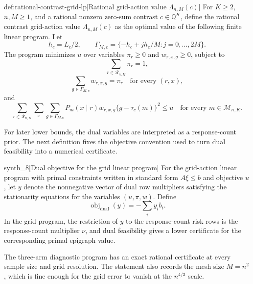\documentclass[11pt]{article}
\begin{document}
\begin{definitionv}{def:rational-contrast-grid-lp}[Rational grid-action value \(\Lambda_{n,M}(c)\)]
For \(K\geq 2\), \(n,M\geq 1\), and a rational nonzero zero-sum contrast \(c\in\mathbb Q^K\), define the rational contrast grid-action value \(\Lambda_{n,M}(c)\) as the optimal value of the following finite linear program. Let
\[
h_c=L_c/2,
\qquad
\Gamma_{M,c}=\{-h_c+jh_c/M:j=0,\ldots,2M\}.
\]
The program minimizes \(u\) over variables \(\pi_r\geq0\) and \(w_{r,x,g}\geq0\), subject to
\[
\sum_{r\in\mathcal R_{n,K}}\pi_r=1,
\]
\[
\sum_{g\in\Gamma_{M,c}}w_{r,x,g}=\pi_r
\quad\text{for every }(r,x),
\]
and
\[
\sum_{r\in\mathcal R_{n,K}}\sum_x\sum_{g\in\Gamma_{M,c}}
P_m(x\mid r)w_{r,x,g}\{g-\tau_c(m)\}^2\leq u
\quad\text{for every }m\in\mathcal M_{n,K}.
\]
\end{definitionv}

For later lower bounds, the dual variables are interpreted as a response-count prior. The next definition fixes the objective convention used to turn dual feasibility into a numerical certificate.

\begin{definitionv}{synth_8}[Dual objective for the grid linear program]
For the grid-action linear program with primal constraints written in standard form \(A\xi\le b\) and objective \(u\), let \(y\) denote the nonnegative vector of dual row multipliers satisfying the stationarity equations for the variables \((u,\pi,w)\). Define
\[
\operatorname{obj}_{\mathrm{dual}}(y)=-\sum_i y_i b_i.
\]
In the grid program, the restriction of \(y\) to the response-count risk rows is the response-count multiplier \(\nu\), and dual feasibility gives a lower certificate for the corresponding primal epigraph value.
\end{definitionv}

The three-arm diagnostic program has an exact rational certificate at every sample size and grid resolution. The statement also records the mesh size \(M=n^2\), which is fine enough for the grid error to vanish at the \(n^{4/3}\) scale.
\end{document}
